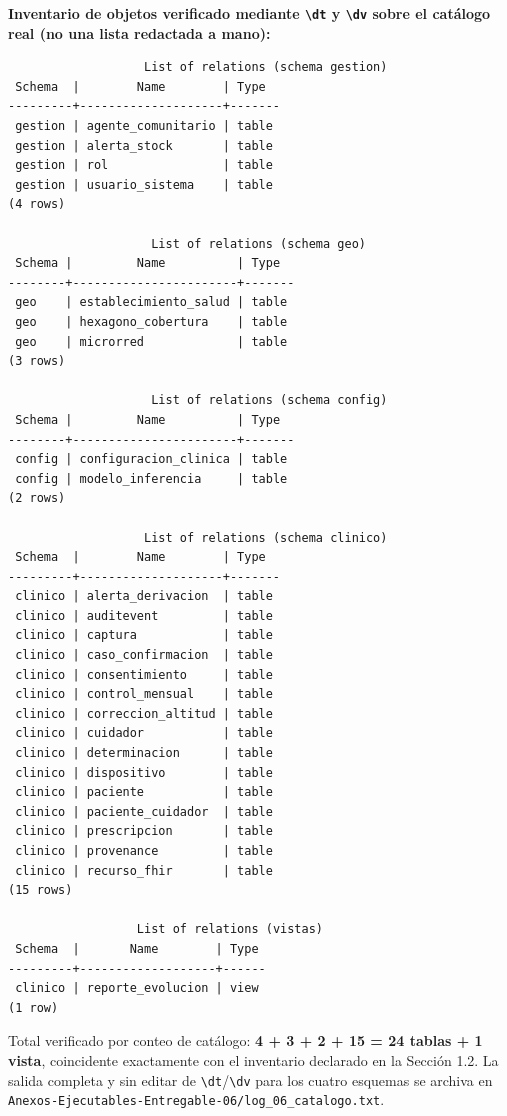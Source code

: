 \documentclass[11pt,a4paper]{article}
\begin{document}
\textbf{Inventario de objetos verificado mediante \texttt{\textbackslash{}dt} y \texttt{\textbackslash{}dv} sobre el catálogo real (no una lista redactada a mano):}

\begin{samepage}\begin{verbatim}
                   List of relations (schema gestion)
 Schema  |        Name        | Type
---------+--------------------+-------
 gestion | agente_comunitario | table
 gestion | alerta_stock       | table
 gestion | rol                | table
 gestion | usuario_sistema    | table
(4 rows)

                    List of relations (schema geo)
 Schema |         Name          | Type
--------+-----------------------+-------
 geo    | establecimiento_salud | table
 geo    | hexagono_cobertura    | table
 geo    | microrred             | table
(3 rows)

                    List of relations (schema config)
 Schema |         Name          | Type
--------+-----------------------+-------
 config | configuracion_clinica | table
 config | modelo_inferencia     | table
(2 rows)

                   List of relations (schema clinico)
 Schema  |        Name        | Type
---------+--------------------+-------
 clinico | alerta_derivacion  | table
 clinico | auditevent         | table
 clinico | captura            | table
 clinico | caso_confirmacion  | table
 clinico | consentimiento     | table
 clinico | control_mensual    | table
 clinico | correccion_altitud | table
 clinico | cuidador           | table
 clinico | determinacion      | table
 clinico | dispositivo        | table
 clinico | paciente           | table
 clinico | paciente_cuidador  | table
 clinico | prescripcion       | table
 clinico | provenance         | table
 clinico | recurso_fhir       | table
(15 rows)

                  List of relations (vistas)
 Schema  |       Name        | Type
---------+-------------------+------
 clinico | reporte_evolucion | view
(1 row)
\end{verbatim}\end{samepage}

Total verificado por conteo de catálogo: \textbf{4 + 3 + 2 + 15 = 24 tablas + 1 vista}, coincidente exactamente con el inventario declarado en la Sección 1.2. La salida completa y sin editar de \texttt{\textbackslash{}dt}/\texttt{\textbackslash{}dv} para los cuatro esquemas se archiva en \texttt{Anexos-Ejecutables-Entregable-06/log\_06\_catalogo.txt}.
\end{document}
